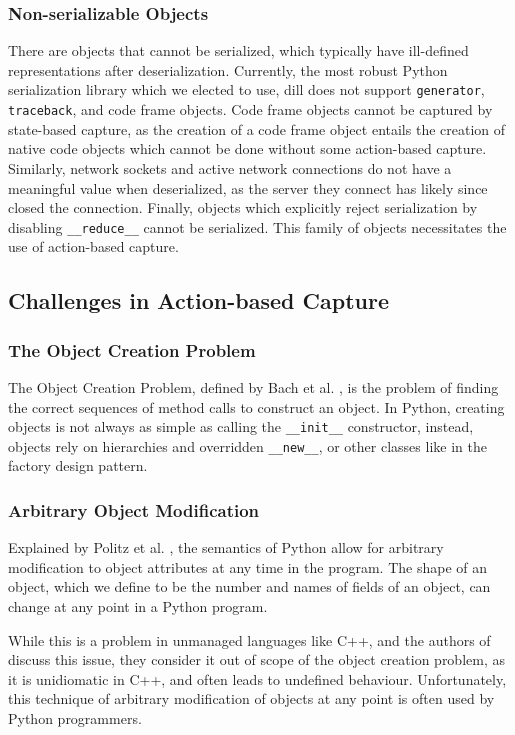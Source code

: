 \subsubsection{Non-serializable Objects}

There are objects that cannot be serialized, which typically have ill-defined representations after
deserialization. Currently, the most robust
Python serialization library which we elected to use, dill \cite{dilldocs} does not support \verb|generator|,
\verb|traceback|, and code frame objects. Code frame
objects cannot be captured by state-based capture, as the creation of a code frame object entails the
creation of native code objects which cannot be
done without some action-based capture. Similarly, network sockets and active network connections do not have
a meaningful value when deserialized,
as the server they connect has likely since closed the connection. Finally, objects which explicitly reject
serialization by disabling
\verb|__reduce__| cannot be serialized. This family of objects necessitates the use of action-based capture.

\subsection{Challenges in Action-based Capture}

\subsubsection{The Object Creation Problem}
The Object Creation Problem, defined by Bach et al. \cite{bach2020determining}, is the problem of finding the
correct sequences of method calls to
construct an object. In Python, creating objects is not always as simple as calling the \verb|__init__|
constructor, instead, objects rely on
hierarchies and overridden \verb|__new__|, or other classes like in the factory design pattern.

\subsubsection{Arbitrary Object Modification}
Explained by Politz et al. \cite{politz2013python}, the semantics of Python allow for arbitrary modification
to object attributes at any time in the
program. The shape of an object, which we define to be the number and names of fields of an object, can
change at any point in a Python program.

While this is a problem in unmanaged languages like C++, and the authors of \cite{bach2020determining}
discuss this issue, they consider it out of
scope of the object creation problem, as it is unidiomatic in C++, and often leads to undefined behaviour.
Unfortunately, this technique of arbitrary
modification of objects at any point is often used by Python programmers.

